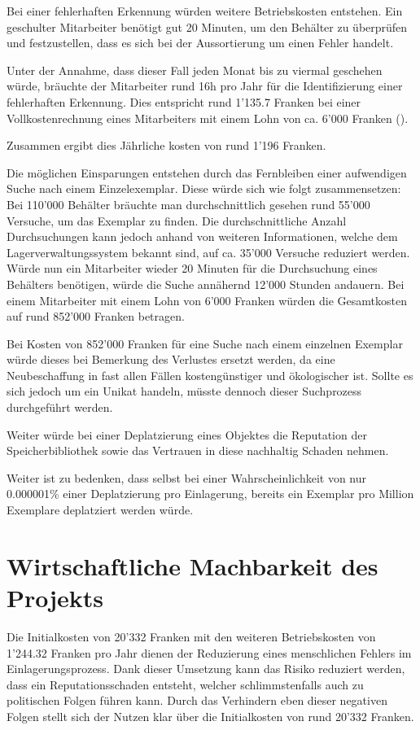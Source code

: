 Bei einer fehlerhaften Erkennung würden weitere Betriebskosten entstehen. Ein geschulter Mitarbeiter benötigt gut 20 Minuten, um den Behälter zu überprüfen und festzustellen, dass es sich bei der Aussortierung um einen Fehler handelt.

Unter der Annahme, dass dieser Fall jeden Monat bis zu viermal geschehen würde, bräuchte der Mitarbeiter rund 16h pro Jahr für die Identifizierung einer fehlerhaften Erkennung. Dies entspricht rund 1'135.7 Franken bei einer Vollkostenrechnung eines Mitarbeiters mit einem Lohn von ca. 6'000 Franken (\cite{KostenProMitarbeiter2013}).

Zusammen ergibt dies Jährliche kosten von rund 1'196 Franken.

Die möglichen Einsparungen entstehen durch das Fernbleiben einer aufwendigen Suche nach einem Einzelexemplar. Diese würde sich wie folgt zusammensetzen:
Bei 110'000 Behälter bräuchte man durchschnittlich gesehen rund 55'000 Versuche, um das Exemplar zu finden. Die durchschnittliche Anzahl Durchsuchungen kann jedoch anhand von weiteren Informationen, welche dem Lagerverwaltungssystem bekannt sind, auf ca. 35'000 Versuche reduziert werden. Würde nun ein Mitarbeiter wieder 20 Minuten für die Durchsuchung eines Behälters benötigen, würde die Suche annähernd 12'000 Stunden andauern. Bei einem Mitarbeiter mit einem Lohn von 6'000 Franken würden die Gesamtkosten auf rund 852'000 Franken betragen.

Bei Kosten von 852'000 Franken für eine Suche nach einem einzelnen Exemplar würde dieses bei Bemerkung des Verlustes ersetzt werden, da eine Neubeschaffung in fast allen Fällen kostengünstiger und ökologischer ist. Sollte es sich jedoch um ein Unikat handeln, müsste dennoch dieser Suchprozess durchgeführt werden.

Weiter würde bei einer Deplatzierung eines Objektes die Reputation der Speicherbibliothek sowie das Vertrauen in diese nachhaltig Schaden nehmen.

Weiter ist zu bedenken, dass selbst bei einer Wahrscheinlichkeit von nur 0.000001\% einer Deplatzierung pro Einlagerung, bereits ein Exemplar pro Million Exemplare deplatziert werden würde.

\chapter{Wirtschaftliche Machbarkeit des Projekts}
Die Initialkosten von 20'332 Franken mit den weiteren Betriebskosten von 1'244.32 Franken pro Jahr dienen der Reduzierung eines menschlichen Fehlers im Einlagerungsprozess. Dank dieser Umsetzung kann das Risiko reduziert werden, dass ein Reputationsschaden entsteht, welcher schlimmstenfalls auch zu politischen Folgen führen kann.
Durch das Verhindern eben dieser negativen Folgen stellt sich der Nutzen klar über die Initialkosten von rund 20'332 Franken.


